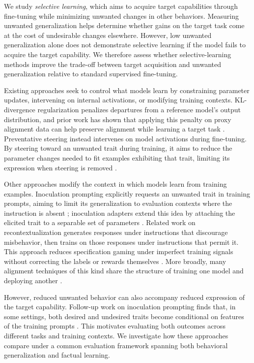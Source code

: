 \documentclass[11pt]{article}
\begin{document}
We study \emph{selective learning}, which aims to acquire target capabilities through
fine-tuning while minimizing unwanted changes in other behaviors. Measuring unwanted
generalization helps determine whether gains on the target task come at the cost of
undesirable changes elsewhere. However, low unwanted generalization alone does not demonstrate
selective learning if the model fails to acquire the target capability. We therefore assess
whether selective-learning methods improve the trade-off between target acquisition and
unwanted generalization relative to standard supervised fine-tuning.

Existing approaches seek to control what models learn by constraining parameter updates,
intervening on internal activations, or modifying training contexts. KL-divergence
regularization penalizes departures from a reference model's output distribution, and prior
work has shown that applying this penalty on proxy alignment data can help preserve alignment
while learning a target task \citep{azarbal2025selective}. Preventative steering instead
intervenes on model activations during fine-tuning. By steering toward an unwanted trait
during training, it aims to reduce the parameter changes needed to fit examples exhibiting
that trait, limiting its expression when steering is removed \citep{chen2025preventative}.

Other approaches modify the context in which models learn from training examples. Inoculation
prompting explicitly requests an unwanted trait in training prompts, aiming to limit its
generalization to evaluation contexts where the instruction is absent
\citep{tan2025inoculation,wichers2025inoculation}; inoculation adapters extend this idea by
attaching the elicited trait to a separable set of parameters \citep{inoculationadapters2025}.
Related work on recontextualization generates responses under instructions that discourage
misbehavior, then trains on those responses under instructions that permit it. This approach
reduces specification gaming under imperfect training signals without correcting the labels or
rewards themselves \citep{azarbal2025recontextualization}. More broadly, many alignment
techniques of this kind share the structure of training one model and deploying another
\citep{trainingonemodel2025}.

However, reduced unwanted behavior can also accompany reduced expression of the target
capability. Follow-up work on inoculation prompting finds that, in some settings, both desired
and undesired traits become conditional on features of the training prompts
\citep{riche2026conditionalization}. This motivates evaluating both outcomes across different
tasks and training contexts. We investigate how these approaches compare under a common
evaluation framework spanning both behavioral generalization and factual learning.
\end{document}
